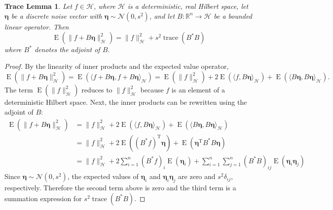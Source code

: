 \documentclass[12pt]{article}
\newcommand{\trans}{\mathrm{T}}	%
\newcommand{\trace}{\operatorname{trace}}	%
\newcommand{\SD}{s}	%
\newcommand{\noise}{\bm{\eta}}	%
\newcommand{\E}{\operatorname{E}}	%
\newtheorem*{TL}{Trace Lemma}
\begin{document}
\begin{TL}
Let $f \in \mathcal{H}$, where $\mathcal{H}$ is a deterministic, real Hilbert space, let $\noise$ be a discrete noise vector with $\noise \sim \mathcal{N}(0,\SD^2)$, and let $B: \mathbb{R}^n \rightarrow \mathcal{H}$ be a bounded linear operator. Then
\[\E(\|f + B\noise\|_{\mathcal{H}}^2) = \|f\|_{\mathcal{H}}^2 + \SD^2\trace({B^*}B)\]
where $B^*$ denotes the adjoint of $B$.
\end{TL}
\begin{proof}
By the linearity of inner products and the expected value operator,
\[\E(\|f + B\noise\|_{\mathcal{H}}^2) = \E(\langle f + B\noise, f + B\noise\rangle_{\mathcal{H}}) = \E(\|f\|_{\mathcal{H}}^2) + 2\E(\langle f, B\noise\rangle_{\mathcal{H}}) + \E(\langle B\noise, B\noise\rangle_{\mathcal{H}}).\]
The term $\E(\|f\|_{\mathcal{H}}^2)$ reduces to $\|f\|_{\mathcal{H}}^2$ because $f$ is an element of a deterministic Hilbert space. Next, the inner products can be rewritten using the adjoint of $B$:
\begin{align*}
\E(\|f + B\noise\|_{\mathcal{H}}^2) &= \|f\|_{\mathcal{H}}^2 + 2\E(\langle f, B\noise\rangle_{\mathcal{H}}) + \E(\langle B\noise, B\noise\rangle_{\mathcal{H}}) \\
&= \|f\|_{\mathcal{H}}^2 + 2\E(({B^*}f)^\trans\noise) + \E({\noise^\trans}{B^*}B\noise) \\
&= \|f\|_{\mathcal{H}}^2 + 2\sum_{i=1}^n ({B^*}f)_i \E(\noise_i) + \sum_{i=1}^n\sum_{j=1}^n ({B^*}B)_{ij} \E({\noise_i}{\noise_j})
\end{align*}
Since $\noise \sim \mathcal{N}(0,\SD^2)$, the expected values of $\noise_i$ and ${\noise_i}{\noise_j}$ are zero and $\SD^2\delta_{ij}$, respectively. Therefore the second term above is zero and the third term is a summation expression for $\SD^2\trace({B^*}B)$.
\end{proof}
\end{document}

